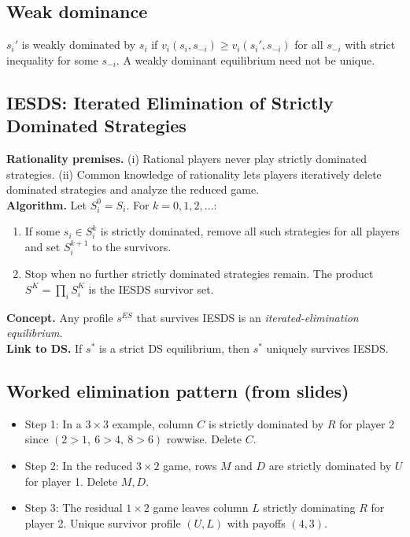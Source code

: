 \documentclass[11pt]{article}
\begin{document}
\begin{multicols}{2}
\subsection*{Weak dominance}
$s_i'$ is weakly dominated by $s_i$ if $v_i(s_i,s_{-i})\ge v_i(s_i',s_{-i})$ for all $s_{-i}$ with strict inequality for some $s_{-i}$. A weakly dominant equilibrium need not be unique.

\subsection*{IESDS: Iterated Elimination of Strictly Dominated Strategies}
\textbf{Rationality premises.} (i) Rational players never play strictly dominated strategies. (ii) Common knowledge of rationality lets players iteratively delete dominated strategies and analyze the reduced game.\\[2pt]
\textbf{Algorithm.} Let $S_i^0=S_i$. For $k=0,1,2,\dots$:
\begin{enumerate}[label=\arabic*)]
\item If some $s_i\in S_i^k$ is strictly dominated, remove all such strategies for all players and set $S_i^{k+1}$ to the survivors.
\item Stop when no further strictly dominated strategies remain. The product $S^K=\prod_i S_i^K$ is the IESDS survivor set.
\end{enumerate}
\textbf{Concept.} Any profile $s^{ES}$ that survives IESDS is an \emph{iterated-elimination equilibrium}.\\
\textbf{Link to DS.} If $s^*$ is a strict DS equilibrium, then $s^*$ uniquely survives IESDS.

\subsection*{Worked elimination pattern (from slides)}
\begin{itemize}
\item Step 1: In a $3\times3$ example, column $C$ is strictly dominated by $R$ for player 2 since $(2>1,\ 6>4,\ 8>6)$ rowwise. Delete $C$.
\item Step 2: In the reduced $3\times2$ game, rows $M$ and $D$ are strictly dominated by $U$ for player 1. Delete $M,D$.
\item Step 3: The residual $1\times2$ game leaves column $L$ strictly dominating $R$ for player 2. Unique survivor profile $(U,L)$ with payoffs $(4,3)$.
\end{itemize}


\end{multicols}
\end{document}
